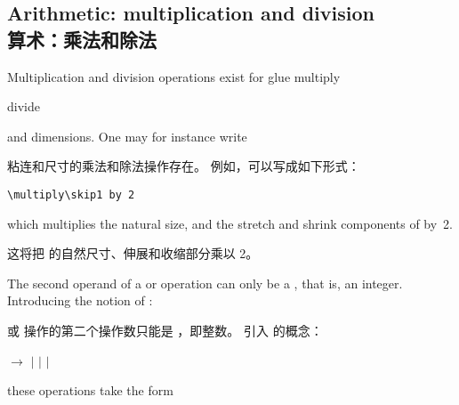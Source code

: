 \documentclass[twoside,letterpaper]{rapport3}
\begin{document}



\setcounter{chapter}{7} 


\subsection{Arithmetic: multiplication and division\\算术：乘法和除法}

Multiplication and division operations exist for glue
\cstoidx multiply\par\cstoidx divide\par
and dimensions. One may for instance write

粘连和尺寸的乘法和除法操作存在。
例如，可以写成如下形式：
\begin{verbatim}
\multiply\skip1 by 2
\end{verbatim}
which multiplies the natural size, and the stretch and shrink
components of  by~2.

这将把  的自然尺寸、伸展和收缩部分乘以 2。

The second operand of a  or 
operation can only be a , that is, an integer.
Introducing the notion of :

 或  操作的第二个操作数只能是 ，即整数。
引入  的概念：
\begin{disp} $\longrightarrow$ 
     $|$  \nl
     \indent $|$  $|$ \end{disp}
these operations take the form
\end{document}

